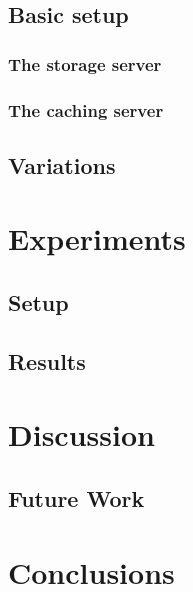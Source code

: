 \documentclass[twoside,openright]{uva-bachelor-thesis}
\begin{document}
\section{Basic setup}
\subsection{The storage server}
\subsection{The caching server}
\section{Variations}

\chapter{Experiments}
\section{Setup}
\section{Results}

\chapter{Discussion}
\section{Future Work}
\chapter{Conclusions}


\printbibliography{}
\end{document}
